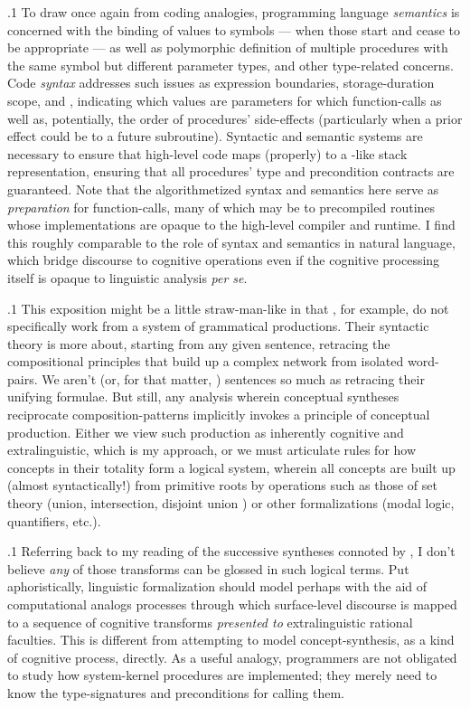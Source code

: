 \documentclass[11pt, twocolumn]{article}
\begin{document}
{{\p.1{%
To draw once again from coding analogies,
programming language \textit{semantics} is concerned with the binding
of values to symbols --- when those  start and
cease to be appropriate --- as well as polymorphic
definition of multiple procedures with the same symbol
but different parameter types, and other type-related
concerns. Code \textit{syntax} addresses such issues as
expression boundaries, storage-duration scope, and , indicating
which values are parameters for which function-calls as
well as, potentially, the order of procedures' side-effects
(particularly when a prior effect could be  to
a future subroutine). Syntactic and
semantic systems are necessary to ensure that high-level code
maps (properly) to a -like stack representation, ensuring that
all procedures' type and precondition contracts are guaranteed.
Note that the algorithmetized syntax and semantics here
serve as \textit{preparation} for function-calls, many of which
may be to precompiled routines whose implementations are
opaque to the high-level compiler and runtime. I find this
roughly comparable to the role of syntax and semantics
in natural language, which bridge discourse to cognitive
operations even if the cognitive processing itself
is opaque to linguistic analysis \textit{per se}.
}%

\p.1{%
This exposition might be a little straw-man-like in that \Boltetal{},
for example, do not specifically work from a system of grammatical
productions. Their syntactic theory is more about, starting
from any given sentence, retracing the compositional principles
that build up a complex network from isolated word-pairs.
We aren't  (or, for that matter, ) sentences
so much as retracing their unifying formulae. But still,
any analysis wherein conceptual syntheses
reciprocate composition-patterns implicitly invokes a
principle of conceptual production.
Either we view such production as inherently cognitive and extralinguistic, which is
my approach, or we must articulate rules for how concepts
in their totality form a logical system, wherein all concepts are
built up (almost syntactically!) from primitive roots by operations such as
those of set theory (union, intersection, disjoint union \ellThree{2pt}{2pt})
or other formalizations (modal logic, quantifiers, etc.).
}%

\p.1{%
Referring back to my reading of the successive syntheses
connoted by , I don't believe
\textit{any} of those transforms can be glossed in such logical terms.
Put aphoristically, linguistic formalization should model
\mdash{} perhaps with the aid of computational analogs \mdash{} processes
through which surface-level discourse is mapped to a sequence
of cognitive transforms \textit{presented to} extralinguistic
rational faculties. This is different from attempting
to model concept-synthesis, as a kind of
 cognitive process,
directly. As a useful analogy, programmers are not obligated to
study how system-kernel procedures are implemented; they merely
need to know the type-signatures and preconditions for calling them.
}%

}}
\end{document}

